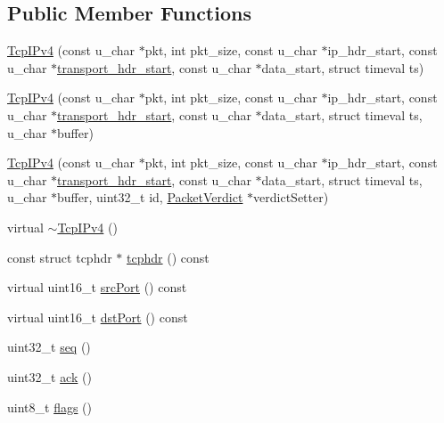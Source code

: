 \subsection*{Public Member Functions}
\begin{DoxyCompactItemize}
\item 
\hyperlink{class_vsid_common_1_1_tcp_i_pv4_a22f0f706d38fe259f29cdad0dc7aae06}{Tcp\-I\-Pv4} (const u\-\_\-char $\ast$pkt, int pkt\-\_\-size, const u\-\_\-char $\ast$ip\-\_\-hdr\-\_\-start, const u\-\_\-char $\ast$\hyperlink{class_vsid_common_1_1_i_pv4_packet_a2318e0a0cc6d297eda5c4eb57682eb09}{transport\-\_\-hdr\-\_\-start}, const u\-\_\-char $\ast$data\-\_\-start, struct timeval ts)
\item 
\hyperlink{class_vsid_common_1_1_tcp_i_pv4_a2bca5f609c9177fe92011c7dbeaa560d}{Tcp\-I\-Pv4} (const u\-\_\-char $\ast$pkt, int pkt\-\_\-size, const u\-\_\-char $\ast$ip\-\_\-hdr\-\_\-start, const u\-\_\-char $\ast$\hyperlink{class_vsid_common_1_1_i_pv4_packet_a2318e0a0cc6d297eda5c4eb57682eb09}{transport\-\_\-hdr\-\_\-start}, const u\-\_\-char $\ast$data\-\_\-start, struct timeval ts, u\-\_\-char $\ast$buffer)
\item 
\hyperlink{class_vsid_common_1_1_tcp_i_pv4_a0627f068dcb73ff619f5384bf1303e74}{Tcp\-I\-Pv4} (const u\-\_\-char $\ast$pkt, int pkt\-\_\-size, const u\-\_\-char $\ast$ip\-\_\-hdr\-\_\-start, const u\-\_\-char $\ast$\hyperlink{class_vsid_common_1_1_i_pv4_packet_a2318e0a0cc6d297eda5c4eb57682eb09}{transport\-\_\-hdr\-\_\-start}, const u\-\_\-char $\ast$data\-\_\-start, struct timeval ts, u\-\_\-char $\ast$buffer, uint32\-\_\-t id, \hyperlink{class_vsid_common_1_1_packet_verdict}{Packet\-Verdict} $\ast$verdict\-Setter)
\item 
virtual \hyperlink{class_vsid_common_1_1_tcp_i_pv4_a73baf02824129c6d54013b3996a5e5df}{$\sim$\-Tcp\-I\-Pv4} ()
\item 
const struct tcphdr $\ast$ \hyperlink{class_vsid_common_1_1_tcp_i_pv4_ac51d536f45c517ffb4033a3e02899d11}{tcphdr} () const 
\item 
virtual uint16\-\_\-t \hyperlink{class_vsid_common_1_1_tcp_i_pv4_ab59a48561087a5d08fece31a08c7a3f4}{src\-Port} () const 
\item 
virtual uint16\-\_\-t \hyperlink{class_vsid_common_1_1_tcp_i_pv4_aa1d46d861e41823153b388605114a816}{dst\-Port} () const 
\item 
uint32\-\_\-t \hyperlink{class_vsid_common_1_1_tcp_i_pv4_a047c06b40b5c602e96142b83e82776bd}{seq} ()
\item 
uint32\-\_\-t \hyperlink{class_vsid_common_1_1_tcp_i_pv4_aa9e710016a42e08b176ead0c129bfde1}{ack} ()
\item 
uint8\-\_\-t \hyperlink{class_vsid_common_1_1_tcp_i_pv4_adb5c52a0772cf3bd53c41702b877b7d1}{flags} ()
\end{DoxyCompactItemize}
